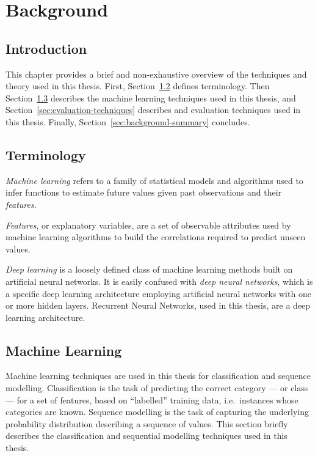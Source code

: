 \chapter{Background}
\label{chap:background}

\section{Introduction}

This chapter provides a brief and non-exhaustive overview of the techniques and theory used in this thesis. First, Section~\ref{sec:background-terminology} defines terminology. Then Section~\ref{sec:background-machine-learning} describes the machine learning techniques used in this thesis, and Section~\ref{sec:evaluation-techniques} describes and evaluation techniques used in this thesis. Finally, Section~\ref{sec:background-summary} concludes.


\section{Terminology}
\label{sec:background-terminology}

\emph{Machine learning} refers to a family of statistical models and algorithms used to infer functions to estimate future values given past observations and their \emph{features}.

\emph{Features}, or explanatory variables, are a set of observable attributes used by machine learning algorithms to build the correlations required to predict unseen values. %

\emph{Deep learning} is a loosely defined class of machine learning methods built on artificial neural networks. It is easily confused with \emph{deep neural networks}, which is a specific deep learning architecture employing artificial neural networks with one or more hidden layers. Recurrent Neural Networks, used in this thesis, are a deep learning architecture.


\section{Machine Learning}
\label{sec:background-machine-learning}

Machine learning techniques are used in this thesis for classification and sequence modelling. Classification is the task of predicting the correct category --- or class --- for a set of features, based on ``labelled'' training data, i.e.\ instances whose categories are known. Sequence modelling is the task of capturing the underlying probability distribution describing a sequence of values. This section briefly describes the classification and sequential modelling techniques used in this thesis.

